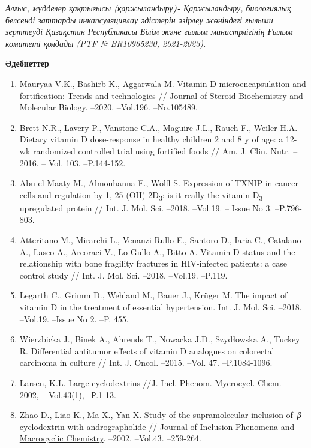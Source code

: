 \emph{Алғыс, мүдделер қақтығысы (қаржыландыру{\bfseries )-} Қаржыландыру,
биологиялық белсенді заттарды инкапсуляциялау әдістерін әзірлеу
жөніндегі ғылыми зерттеуді Қазақстан Республикасы Білім және ғылым
министрлігінің Ғылым комитеті қолдады (PTF № BR10965230, 2021-2023).}

{\bfseries Әдебиеттер}

\begin{enumerate}
\item
Mauryaa V.K., Bashirb K., Aggarwala M. Vitamin D microencapsulation
and fortification: Trends and technologies // Journal of Steroid
Biochemistry and Molecular Biology. --2020. --Vol.196. --No.105489.

\item
Brett N.R., Lavery P., Vanstone C.A., Maguire J.L., Rauch F., Weiler
H.A. Dietary vitamin D dose-response in healthy children 2 and 8 y of
age: a 12-wk randomized controlled trial using fortified foods // Am. J.
Clin. Nutr. --2016. -- Vol. 103. --P.144-152.

\item
Abu el Maaty M., Almouhanna F., Wölfl S. Expression of TXNIP in
cancer cells and regulation by 1, 25 (OH) 2D\textsubscript{3}: is it
really the vitamin D\textsubscript{3} upregulated protein // Int. J.
Mol. Sci. --2018. --Vol.19. -- Issue No 3. --P.796-803.

\item
Atteritano M., Mirarchi L., Venanzi-Rullo E., Santoro D., Iaria C.,
Catalano A., Lasco A., Arcoraci V., Lo Gullo A., Bitto A. Vitamin D
status and the relationship with bone fragility fractures in
HIV-infected patients: a case control study // Int. J. Mol. Sci. --2018.
--Vol.19. --P.119.

\item
Legarth C., Grimm D., Wehland M., Bauer J., Krüger M. The impact of
vitamin D in the treatment of essential hypertension. Int. J. Mol. Sci.
--2018. --Vol.19. --Issue No 2. --P. 455.

\item
Wierzbicka J., Binek A., Ahrends T., Nowacka J.D., Szydłowska A.,
Tuckey R. Differential antitumor effects of vitamin D analogues on
colorectal carcinoma in culture // Int. J. Oncol. --2015. --Vol. 47.
--P.1084-1096.

\item
Larsen, K.L. Large cyclodextrins //J. Incl. Phenom. Mycrocycl. Chem.
--2002, -- Vol.43(1), --Р.1-13.

\item
Zhao D., Liao K., Ma X., Yan X. Study of the supramolecular inclusion
of~\emph{β}-cyclodextrin with andrographolide //
\href{https://link.springer.com/journal/10847}{Journal of Inclusion
Phenomena and Macrocyclic Chemistry}. --2002. --Vol.43. --259-264.


\end{enumerate}

